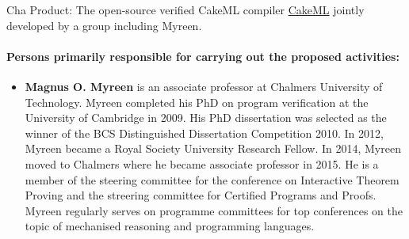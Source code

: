 \begin{sitedescription}{Cha}
Product: The open-source verified CakeML compiler \href{https://cakeml.org/}{CakeML}
jointly developed by a group including Myreen.

\paragraph{Persons primarily responsible for carrying out the proposed activities:}

\begin{itemize}
\item \textbf{Magnus O. Myreen} is an associate professor at Chalmers
  University of Technology.  Myreen completed his PhD on program
  verification at the University of Cambridge in 2009. His PhD
  dissertation was selected as the winner of the BCS Distinguished
  Dissertation Competition 2010. In 2012, Myreen became a Royal
  Society University Research Fellow. In 2014, Myreen moved to
  Chalmers where he became associate professor in 2015.  He is a
  member of the steering committee for the conference on Interactive
  Theorem Proving and the streering committee for Certified Programs
  and Proofs.  Myreen regularly serves on programme committees for top
  conferences on the topic of mechanised reasoning and programming
  languages.
\end{itemize}

\end{sitedescription}

